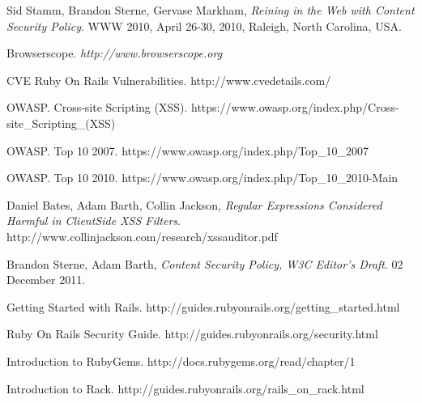 \documentclass[10pt, conference, compsocconf]{IEEEtran}
\begin{document}
\begin{thebibliography}{1}
Sid Stamm, Brandon Sterne, Gervase Markham, \emph{Reining in the Web with Content Security Policy}. WWW 2010, April 26-30, 2010, Raleigh, North Carolina, USA.

Browserscope. \emph{http://www.browserscope.org}

CVE Ruby On Rails Vulnerabilities. http://www.cvedetails.com/

OWASP. Cross-site Scripting (XSS). https://www.owasp.org/index.php/Cross-site\_Scripting\_(XSS)

OWASP. Top 10 2007.  https://www.owasp.org/index.php/Top\_10\_2007

OWASP. Top 10 2010. https://www.owasp.org/index.php/Top\_10\_2010-Main

Daniel Bates, Adam Barth, Collin Jackson, \emph{Regular Expressions Considered Harmful in Client\-Side XSS Filters}. http://www.collinjackson.com/research/xssauditor.pdf

Brandon Sterne, Adam Barth, \emph{Content Security Policy, W3C Editor's Draft}. 02 December 2011.

Getting Started with Rails. http://guides.rubyonrails.org/getting\_started.html

Ruby On Rails Security Guide. http://guides.rubyonrails.org/security.html

Introduction to RubyGems. http://docs.rubygems.org/read/chapter/1

 Introduction to Rack. http://guides.rubyonrails.org/rails\_on\_rack.html

\end{thebibliography}
\end{document}
